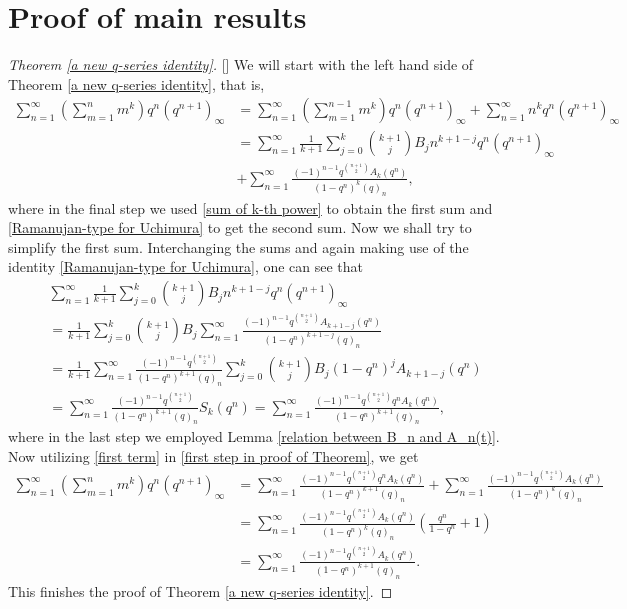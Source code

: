 \documentclass[11pt,reqno]{amsart}
\renewcommand{\(}{\left\(}
\renewcommand{\)}{\right\)}
\renewcommand{\[}{\left\[}
\renewcommand{\]}{\right\]}
\numberwithin{equation}{section}
\theoremstyle{plain}
\begin{document}
\section{Proof of main results}\label{proofs}
\begin{proof}[Theorem \ref{a new q-series identity}][]
We will start with the left hand side of Theorem \ref{a new q-series identity},  that is,  
\begin{align}\label{first step in proof of Theorem}
\sum_{n=1}^\infty \left(\sum_{m=1}^nm^k\right) q^n (q^{n+1})_\infty &= \sum_{n=1}^\infty \left(\sum_{m=1}^{n-1}m^k\right) q^n(q^{n+1})_\infty + \sum_{n=1}^\infty n^k q^n (q^{n+1})_\infty \nonumber\\
&= \sum_{n=1}^\infty \frac{1}{k+1}\sum_{j=0}^k {k+1 \choose j} B_j n^{k+1-j} q^n(q^{n+1})_\infty \nonumber\\
& + \sum_{n=1}^\infty \frac{(-1)^{n-1} q^{{n+1 \choose 2}}A_k(q^n)}{(1-q^n)^{k} (q)_n},
\end{align}
where in the final step we used \eqref{sum of k-th power} to obtain the first sum and  \eqref{Ramanujan-type for Uchimura} to get the second sum.  
Now we shall try to simplify the first sum.  Interchanging the sums and again making use of  the identity \eqref{Ramanujan-type for Uchimura},  one can see that 
\begin{align}\label{first term}
& \sum_{n=1}^\infty \frac{1}{k+1}\sum_{j=0}^k {k+1 \choose j} B_j n^{k+1-j} q^n(q^{n+1})_\infty  \nonumber \\
& = \frac{1}{k+1}\sum_{j=0}^k {k+1 \choose j} B_j \sum_{n=1}^\infty \frac{(-1)^{n-1} q^{{n+1 \choose 2}}A_{k+1-j}(q^n)}{(1-q^n)^{k+1-j} (q)_n} \nonumber\\
&=  \frac{1}{k+1}  \sum_{n=1}^\infty \frac{(-1)^{n-1} q^{{n+1 \choose 2}}}{(1-q^n)^{k+1} (q)_n}  \sum_{j=0}^k {k+1 \choose j} B_j(1-q^n)^j A_{k+1-j}(q^n)\nonumber\\
&=\sum_{n=1}^\infty \frac{(-1)^{n-1} q^{{n+1 \choose 2}}}{(1-q^n)^{k+1} (q)_n} S_k(q^n)=\sum_{n=1}^\infty \frac{(-1)^{n-1} q^{{n+1 \choose 2}} q^nA_k(q^n)}{(1-q^n)^{k+1} (q)_n},  
\end{align}
where in the last step we employed Lemma \ref{relation between B_n and A_n(t)}. Now utilizing \eqref{first term} in \eqref{first step in proof of Theorem},  we get
\begin{align*}
\sum_{n=1}^\infty \left(\sum_{m=1}^nm^k\right) q^n (q^{n+1})_\infty &= \sum_{n=1}^\infty \frac{(-1)^{n-1} q^{{n+1 \choose 2}} q^nA_k(q^n)}{(1-q^n)^{k+1} (q)_n} + \sum_{n=1}^\infty \frac{(-1)^{n-1} q^{{n+1 \choose 2}}A_k(q^n)}{(1-q^n)^{k} (q)_n}\\
&= \sum_{n=1}^\infty \frac{(-1)^{n-1} q^{{n+1 \choose 2}}A_k(q^n)}{(1-q^n)^{k} (q)_n} \left( \frac{q^n}{1-q^n}+1 \right)\\
&=\sum_{n=1}^\infty \frac{(-1)^{n-1} q^{{n+1 \choose 2}}A_k(q^n)}{(1-q^n)^{k+1} (q)_n}.
\end{align*}
This finishes  the proof of Theorem \ref{a new q-series identity}.
\end{proof}
\end{document}
